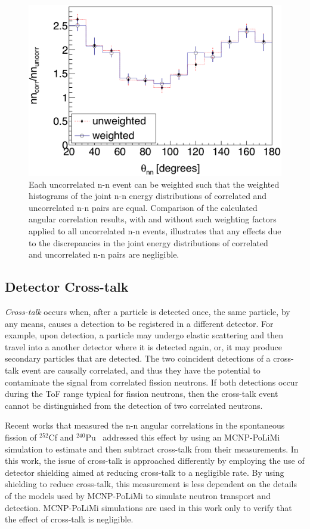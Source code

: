 \begin{figure}[]
\centering
    \includegraphics[width=\figsize\textwidth]{WeightedErgDiff.png}
    \caption{
Each uncorrelated n-n event can be weighted such that the weighted histograms of the joint n-n energy distributions of correlated and uncorrelated n-n pairs are equal.
Comparison of the calculated angular correlation results, with and without such weighting factors applied to all uncorrelated n-n events, illustrates that any effects due to the discrepancies in the joint energy distributions of correlated and uncorrelated n-n pairs are negligible.
    }
    \label{fig:WeightedErgDiff}
\end{figure}

\subsection{Detector Cross-talk}
\label{crosstalk}
\textit{Cross-talk} occurs when, after a particle is detected once, the same particle, by any means, causes a detection to be registered in a different detector.
For example, upon detection, a particle may undergo elastic scattering and then travel into a another detector where it is detected again, or, it may produce secondary particles that are detected.
The two coincident detections of a cross-talk event are causally correlated, and thus they have the potential to contaminate the signal from correlated fission neutrons.
If both detections occur during the ToF range typical for fission neutrons, then the cross-talk event cannot be distinguished from the detection of two correlated neutrons.

Recent works that measured the n-n angular correlations in the spontaneous fission of $^{252}$Cf and $^{240}$Pu~\cite{Pozzi2016,Verbeke2018} addressed this effect by using an MCNP-PoLiMi simulation to estimate and then subtract cross-talk from their measurements.
In this work, the issue of cross-talk is approached differently by employing the use of detector shielding aimed at reducing cross-talk to a negligible rate.
By using shielding to reduce cross-talk, this measurement is less dependent on the details of the models used by MCNP-PoLiMi to simulate neutron transport and detection.
MCNP-PoLiMi simulations are used in this work only to verify that the effect of cross-talk is negligible.

